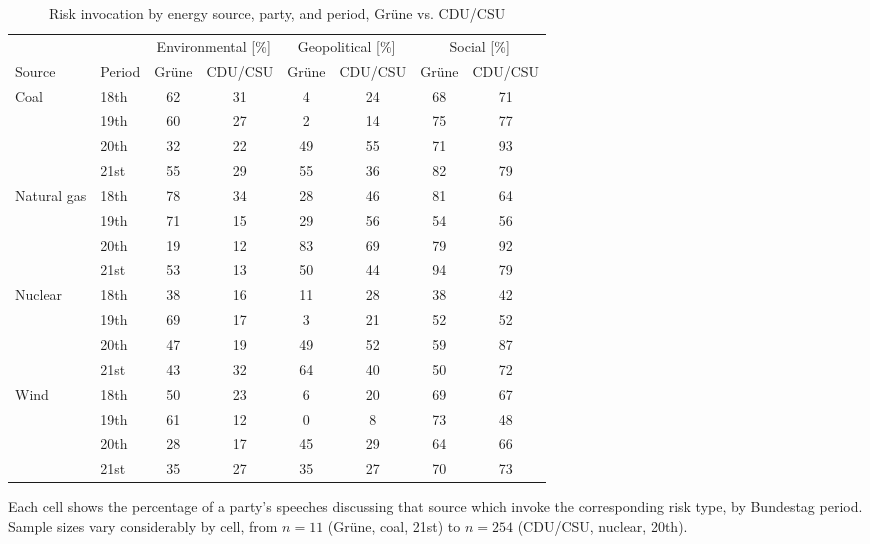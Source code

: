 \begin{table}[H]
    \centering
    \begin{threeparttable}
    \begin{tabular}{llcccccc}
        \toprule
        & & \multicolumn{2}{c}{Environmental [\%]}
        & \multicolumn{2}{c}{Geopolitical [\%]}
        & \multicolumn{2}{c}{Social [\%]} \\
        \cmidrule(lr){3-4}\cmidrule(lr){5-6}\cmidrule(lr){7-8}
        Source & Period & Gr\"{u}ne & CDU/CSU & Gr\"{u}ne & CDU/CSU
               & Gr\"{u}ne & CDU/CSU \\
        \midrule
        \multirow{4}{*}{Coal}
        & 18th & 62 & 31 & 4 & 24 & 68 & 71 \\
        & 19th & 60 & 27 & 2 & 14 & 75 & 77 \\
        & 20th & 32 & 22 & 49 & 55 & 71 & 93 \\
        & 21st & 55 & 29 & 55 & 36 & 82 & 79 \\
        \midrule
        \multirow{4}{*}{Natural gas}
        & 18th & 78 & 34 & 28 & 46 & 81 & 64 \\
        & 19th & 71 & 15 & 29 & 56 & 54 & 56 \\
        & 20th & 19 & 12 & 83 & 69 & 79 & 92 \\
        & 21st & 53 & 13 & 50 & 44 & 94 & 79 \\
        \midrule
        \multirow{4}{*}{Nuclear}
        & 18th & 38 & 16 & 11 & 28 & 38 & 42 \\
        & 19th & 69 & 17 & 3 & 21 & 52 & 52 \\
        & 20th & 47 & 19 & 49 & 52 & 59 & 87 \\
        & 21st & 43 & 32 & 64 & 40 & 50 & 72 \\
        \midrule
        \multirow{4}{*}{Wind}
        & 18th & 50 & 23 & 6 & 20 & 69 & 67 \\
        & 19th & 61 & 12 & 0 & 8 & 73 & 48 \\
        & 20th & 28 & 17 & 45 & 29 & 64 & 66 \\
        & 21st & 35 & 27 & 35 & 27 & 70 & 73 \\
        
    \end{tabular}
    \begin{tablenotes}
    \small
    \item Each cell shows the percentage of a party's speeches discussing that source which invoke the corresponding risk type, by Bundestag period. Sample sizes vary considerably by cell, from $n=11$ (Grüne, coal, 21st) to $n=254$ (CDU/CSU, nuclear, 20th).
    \end{tablenotes}
    \end{threeparttable}
    \caption{Risk invocation by energy source, party, and period,
    Gr\"{u}ne vs. CDU/CSU}
    \label{tab:risk_source}
\end{table}
